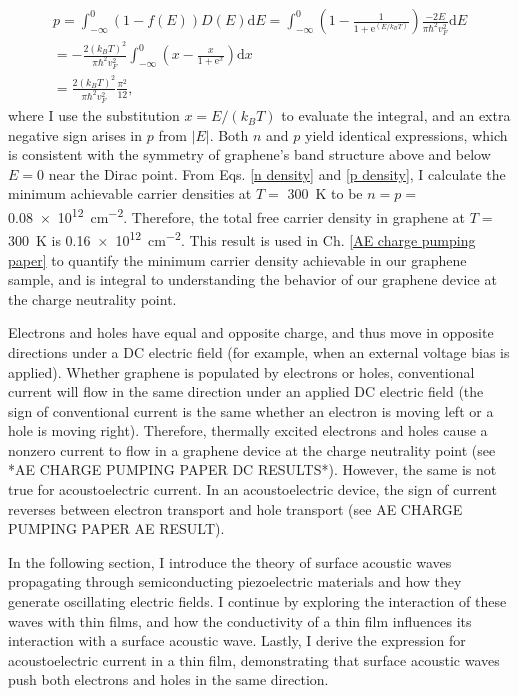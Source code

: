\documentclass[double,12pt,1in]{beavtex}
\begin{document}
\begin{equation}
    \begin{split}
        p = \int_{-\infty}^{0}(1-f(E)) D(E)\mathrm{d}E 
        = \int_{-\infty}^{0}\left( 1 -\frac{1}{1+\mathrm{e}^{(E/k_B T)}} \right) \frac{-2E}{\pi \hbar^2 v_F^2}\mathrm{d}E \\
        = -\frac{2(k_B T)^2}{\pi \hbar^2 v_F^2}\int_{-\infty}^{0}\left(x - \frac{x}{1+\mathrm{e}^{x}}\right)\mathrm{d}x \\
        = \frac{2(k_B T)^2}{\pi\hbar^2 v_F^2} \frac{\pi^2}{12}, \label{p density}
    \end{split}
\end{equation}
where I use the substitution $x = E/(k_B T)$ to evaluate the integral, and an extra negative sign arises in $p$ from $|E|$. Both $n$ and $p$ yield identical expressions, which is consistent with the symmetry of graphene's band structure above and below $E = 0$ near the Dirac point. From Eqs. \ref{n density} and \ref{p density}, I calculate the minimum achievable carrier densities at $T = $ \SI{300}{\kelvin} to be $n = p = $\SI{0.08e12}{\centi\meter^{-2}}. Therefore, the total free carrier density in graphene at $T = $ \SI{300}{\kelvin} is \SI{0.16e12}{\centi\meter^{-2}}. This result is used in Ch. \ref{AE charge pumping paper} to quantify the minimum carrier density achievable in our graphene sample, and is integral to understanding the behavior of our graphene device at the charge neutrality point.

Electrons and holes have equal and opposite charge, and thus move in opposite directions under a DC electric field (for example, when an external voltage bias is applied). Whether graphene is populated by electrons or holes, conventional current will flow in the same direction under an applied DC electric field (the sign of conventional current is the same whether an electron is moving left or a hole is moving right). Therefore, thermally excited electrons and holes cause a nonzero current to flow in a graphene device at the charge neutrality point (see *AE CHARGE PUMPING PAPER DC RESULTS*). However, the same is not true for acoustoelectric current. In an acoustoelectric device, the sign of current reverses between electron transport and hole transport (see AE CHARGE PUMPING PAPER AE RESULT). 

In the following section, I introduce the theory of surface acoustic waves propagating through semiconducting piezoelectric materials and how they generate oscillating electric fields. I continue by exploring the interaction of these waves with thin films, and how the conductivity of a thin film influences its interaction with a surface acoustic wave. Lastly, I derive the expression for acoustoelectric current in a thin film, demonstrating that surface acoustic waves push both electrons and holes in the same direction.
\end{document}
